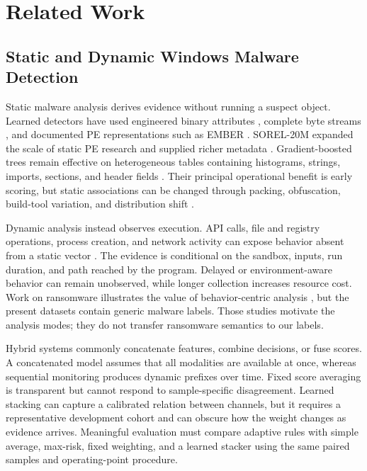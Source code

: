 \section{Related Work}
\label{sec:related}

\subsection{Static and Dynamic Windows Malware Detection}

Static malware analysis derives evidence without running a suspect object.
Learned detectors have used engineered binary attributes
\cite{saxe2015deep}, complete byte streams \cite{raff2018malware}, and documented
PE representations such as EMBER \cite{anderson2018ember}. SOREL-20M expanded
the scale of static PE research and supplied richer metadata
\cite{harang2020sorel}. Gradient-boosted trees remain effective on heterogeneous
tables containing histograms, strings, imports, sections, and header fields
\cite{ke2017lightgbm}. Their principal operational benefit is early scoring, but
static associations can be changed through packing, obfuscation, build-tool
variation, and distribution shift \cite{ucci2019survey,gibert2020rise}.

Dynamic analysis instead observes execution. API calls, file and registry
operations, process creation, and network activity can expose behavior absent
from a static vector \cite{sikorski2012practical,sgandurra2016automated}. The
evidence is conditional on the sandbox, inputs, run duration, and path reached by
the program. Delayed or environment-aware behavior can remain unobserved, while
longer collection increases resource cost. Work on ransomware illustrates the
value of behavior-centric analysis \cite{kharraz2015cutting,bacci2021ransomware},
but the present datasets contain generic malware labels. Those studies motivate
the analysis modes; they do not transfer ransomware semantics to our labels.

Hybrid systems commonly concatenate features, combine decisions, or fuse
scores. A concatenated model assumes that all modalities are available at once,
whereas sequential monitoring produces dynamic prefixes over time. Fixed score
averaging is transparent but cannot respond to sample-specific disagreement.
Learned stacking can capture a calibrated relation between channels, but it
requires a representative development cohort and can obscure how the weight
changes as evidence arrives. Meaningful evaluation must compare adaptive rules
with simple average, max-risk, fixed weighting, and a learned stacker using the
same paired samples and operating-point procedure.

